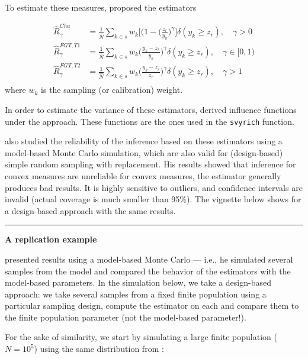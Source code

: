 \documentclass[
]{book}
\begin{document}
To estimate these measures, \textcite{brz2014} proposed the estimators

\[
\begin{aligned}
\widehat{R}^{Cha}_\gamma &= \frac{1}{\widehat{N}} \sum_{k \in s} w_k \bigg[( 1 - \bigg( \frac{z_r}{y_k}\bigg)^\gamma \bigg] \delta( y_k \geq z_r ) , \quad \gamma > 0 \\
\widehat{R}^{FGT,T1}_\gamma &= \frac{1}{\widehat{N}} \sum_{k \in s} w_k \bigg( \frac{y_k - z_r}{y_k} \bigg)^\gamma \delta( y_k \geq z_r ) , \quad \gamma \in [0,1) \\
\widehat{R}^{FGT,T2}_\gamma &= \frac{1}{\widehat{N}} \sum_{k \in s} w_k \bigg( \frac{y_k - z_r}{z_r} \bigg)^\gamma \delta( y_k \geq z_r ) , \quad \gamma > 1 \\
\end{aligned}
\]
\noindent where \(w_k\) is the sampling (or calibration) weight.

In order to estimate the variance of these estimators, \textcite{brz2014} derived influence functions under the \textcite{deville1999} approach. These functions are the ones used in the \texttt{svyrich} function.

\textcite{brz2014} also studied the reliability of the inference based on these estimators
using a model-based Monte Carlo simulation, which are also valid for (design-based)
simple random sampling with replacement. His results showed that inference for convex
measures are unreliable for convex measures, the estimator generally produces bad results. It is highly sensitive to outliers, and confidence intervals are invalid (actual coverage is much smaller than 95\%). The vignette below shows for a design-based approach with the same results.

\begin{center}\rule{0.5\linewidth}{0.5pt}\end{center}

\textbf{A replication example}

\textcite{brz2014} presented results using a model-based Monte Carlo --- i.e., he simulated
several samples from the model and compared the behavior of the estimators with
the model-based parameters.
In the simulation below, we take a design-based approach: we take several samples
from a fixed finite population using a particular sampling design, compute the estimator
on each and compare them to the finite population parameter (not the model-based
parameter!).

For the sake of similarity, we start by simulating a large finite population (\(N = 10^5\))
using the same distribution from \textcite{brz2014}:
\end{document}
